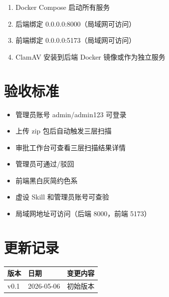 \documentclass[11pt,a4paper]{article}
\begin{document}
\begin{enumerate}[nosep]
  \item Docker Compose 启动所有服务
  \item 后端绑定 0.0.0.0:8000（局域网可访问）
  \item 前端绑定 0.0.0.0:5173（局域网可访问）
  \item ClamAV 安装到后端 Docker 镜像或作为独立服务
\end{enumerate}

\section{验收标准}

\begin{itemize}
  \item[$\square$] 管理员账号 admin/admin123 可登录
  \item[$\square$] 上传 zip 包后自动触发三层扫描
  \item[$\square$] 审批工作台可查看三层扫描结果详情
  \item[$\square$] 管理员可通过/驳回
  \item[$\square$] 前端黑白灰简约色系
  \item[$\square$] 虚设 Skill 和管理员账号可查验
  \item[$\square$] 局域网地址可访问（后端 8000，前端 5173）
\end{itemize}

\section*{更新记录}

\begin{tabular}{lll}
\toprule
版本 & 日期 & 变更内容 \\
\midrule
v0.1 & 2026-05-06 & 初始版本 \\
\bottomrule
\end{tabular}
\end{document}
